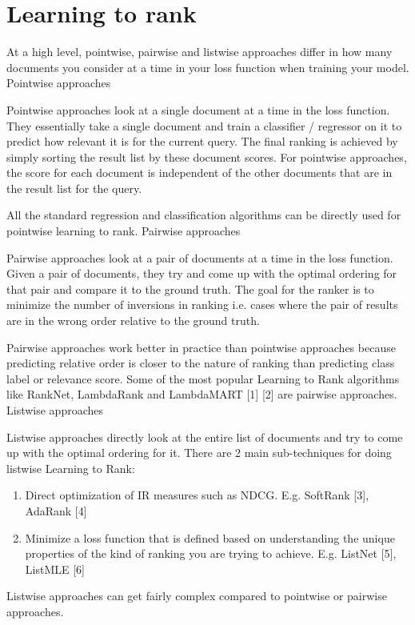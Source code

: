 \documentclass{book}
\begin{document}
\chapter{Learning to rank}

At a high level, pointwise, pairwise and listwise approaches differ in how many documents you consider at a time in your loss function when training your model.
Pointwise approaches

Pointwise approaches look at a single document at a time in the loss function. They essentially take a single document and train a classifier / regressor on it to predict how relevant it is for the current query. The final ranking is achieved by simply sorting the result list by these document scores. For pointwise approaches, the score for each document is independent of the other documents that are in the result list for the query.

All the standard regression and classification algorithms can be directly used for pointwise learning to rank.
Pairwise approaches

Pairwise approaches look at a pair of documents at a time in the loss function. Given a pair of documents, they try and come up with the optimal ordering for that pair and compare it to the ground truth. The goal for the ranker is to minimize the number of inversions in ranking i.e. cases where the pair of results are in the wrong order relative to the ground truth.

Pairwise approaches work better in practice than pointwise approaches because predicting relative order is closer to the nature of ranking than predicting class label or relevance score. Some of the most popular Learning to Rank algorithms like RankNet, LambdaRank and LambdaMART [1] [2] are pairwise approaches.
Listwise approaches

Listwise approaches directly look at the entire list of documents and try to come up with the optimal ordering for it. There are 2 main sub-techniques for doing listwise Learning to Rank:
\begin{enumerate}
\item Direct optimization of IR measures such as NDCG. E.g. SoftRank [3], AdaRank [4]
\item Minimize a loss function that is defined based on understanding the unique properties of the kind of ranking you are trying to achieve. E.g. ListNet [5], ListMLE [6]
\end{enumerate}
Listwise approaches can get fairly complex compared to pointwise or pairwise approaches.
\end{document}
